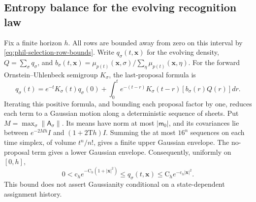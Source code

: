 \subsection*{Entropy balance for the evolving recognition law}

Fix a finite horizon \(h\). All rows are bounded away from zero on this
interval by \cref{eq:phil-selection-row-bounds}. Write \(q_\sigma(t,\mathbf x)\)
for the evolving density, \(Q=\sum_\sigma q_\sigma\), and
\(b_\sigma(t,\mathbf x)=\mu_{p(t)}(\mathbf x,\sigma)/
 \sum_\eta\mu_{p(t)}(\mathbf x,\eta)\).
For the forward Ornstein--Uhlenbeck semigroup \(K_\sigma\), the last-proposal
formula is
\begin{equation}
 q_\sigma(t)=e^{-t}K_\sigma(t)q_\sigma(0)
   +\int_0^te^{-(t-r)}K_\sigma(t-r)[b_\sigma(r)Q(r)]dr.
\label{eq:phil-selection-forward}
\end{equation}
Iterating this positive formula, and bounding each proposal factor by one,
reduces each term to a Gaussian motion along a deterministic sequence of
sheets. Put \(M=\max_\sigma\|\mathsf A_\sigma\|\).
Its means have norm at most \(|\mathsf m_0|\), and its covariances lie between
\(e^{-2Mh}I\) and \((1+2\mathrm Th)I\). Summing the at most \(16^n\)
sequences on each time simplex, of volume \(t^n/n!\), gives a finite upper
Gaussian envelope. The no-proposal term gives a lower Gaussian envelope.
Consequently, uniformly on \([0,h]\),
\begin{equation}
 0<\mathrm c_he^{-\mathrm C_h(1+|\mathbf x|^2)}
 \le q_\sigma(t,\mathbf x)\le\mathrm C_he^{-\mathrm c_h|\mathbf x|^2}.
\label{eq:phil-selection-density-envelopes}
\end{equation}
This bound does not assert Gaussianity conditional on a state-dependent
assignment history.

